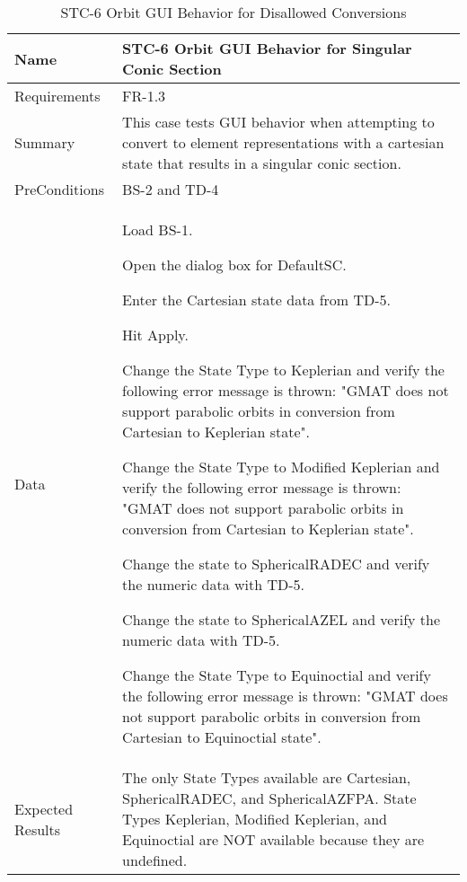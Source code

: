 

\begin{table}[htbp!]
\centering
      \begin{tabular}{|p{1.05 in} |p{4.75 in} |}
      \hline
         \rowcolor[rgb]{0.8,0.8,0.8} Name & STC-6 Orbit GUI Behavior for Singular Conic Section\\
         \hline
         Requirements & FR-1.3\\  \hline
         Summary &
         This  case tests GUI behavior when attempting to convert to element representations with 
         a cartesian state that results in a singular conic section.
         \\     \hline
         PreConditions & BS-2 and TD-4\\     \hline
         Data &
         \begin{compactenum}
             \item Load BS-1.
             \item Open the dialog box for DefaultSC.
             \item Enter the Cartesian state data from TD-5.
             \item Hit Apply.
             \item Change the State Type to Keplerian and verify the following error message is thrown:
             "GMAT does not support parabolic orbits in conversion from Cartesian to Keplerian state".
             \item Change the State Type to Modified Keplerian and verify the following error message is thrown:
             "GMAT does not support parabolic orbits in conversion from Cartesian to Keplerian state".
             \item Change the state to SphericalRADEC and verify the numeric data with TD-5.
             \item Change the state to SphericalAZEL and verify the numeric data with TD-5.
             \item Change the State Type to Equinoctial and verify the following error message is thrown:
             "GMAT does not support parabolic orbits in conversion from Cartesian to Equinoctial state".
         \end{compactenum}
         \\ \hline
         Expected Results & The only State Types available are Cartesian, SphericalRADEC, and SphericalAZFPA.   State Types Keplerian, Modified Keplerian, and Equinoctial are NOT available because they are undefined.\\
      \hline
\end{tabular}
      \label{Table:STC-6}
      \caption{STC-6 Orbit GUI Behavior for Disallowed Conversions}
\end{table} 